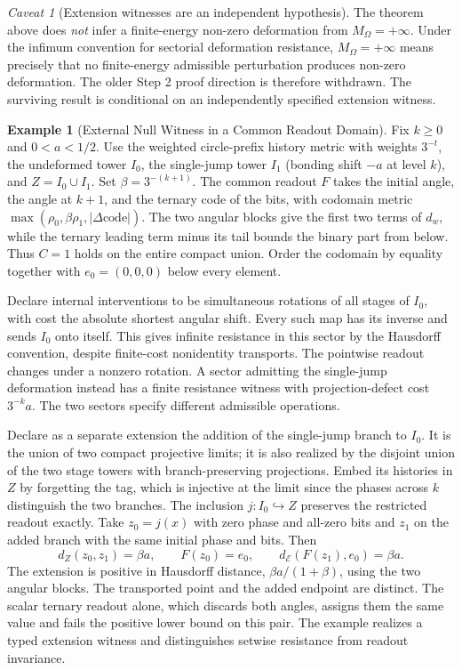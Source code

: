 \documentclass[11pt,a4paper]{article}
\theoremstyle{plain}
\theoremstyle{definition}
\newtheorem{example}[theorem]{Example}
\theoremstyle{remark}
\newtheorem{caveat}[theorem]{Caveat}
\newcommand{\MO}{M_\Omega}
\begin{document}
\begin{caveat}[Extension witnesses are an independent hypothesis]
The theorem above does \emph{not} infer a finite-energy non-zero deformation from $\MO=+\infty$. Under the infimum convention for sectorial deformation resistance, $\MO=+\infty$ means precisely that no finite-energy admissible perturbation produces non-zero deformation. The older Step 2 proof direction is therefore withdrawn. The surviving result is conditional on an independently specified extension witness.
\end{caveat}

\begin{example}[External Null Witness in a Common Readout Domain]\label{ex:joint-external-null-witness}
Fix $k\geq0$ and $0<a<1/2$. Use the weighted circle-prefix history metric with weights $3^{-t}$, the undeformed tower $I_0$, the single-jump tower $I_1$ (bonding shift $-a$ at level $k$), and $Z=I_0\cup I_1$. Set $\beta=3^{-(k+1)}$. The common readout $F$ takes the initial angle, the angle at $k+1$, and the ternary code of the bits, with codomain metric $\max(\rho_0,\beta\rho_1,|\Delta\text{code}|)$. The two angular blocks give the first two terms of $d_w$, while the ternary leading term minus its tail bounds the binary part from below. Thus $C=1$ holds on the entire compact union. Order the codomain by equality together with $e_0=(0,0,0)$ below every element.

Declare internal interventions to be simultaneous rotations of all stages of $I_0$, with cost the absolute shortest angular shift. Every such map has its inverse and sends $I_0$ onto itself. This gives infinite resistance in this sector by the Hausdorff convention, despite finite-cost nonidentity transports. The pointwise readout changes under a nonzero rotation. A sector admitting the single-jump deformation instead has a finite resistance witness with projection-defect cost $3^{-k}a$. The two sectors specify different admissible operations.

Declare as a separate extension the addition of the single-jump branch to $I_0$. It is the union of two compact projective limits; it is also realized by the disjoint union of the two stage towers with branch-preserving projections. Embed its histories in $Z$ by forgetting the tag, which is injective at the limit since the phases across $k$ distinguish the two branches. The inclusion $j:I_0\hookrightarrow Z$ preserves the restricted readout exactly. Take $z_0=j(x)$ with zero phase and all-zero bits and $z_1$ on the added branch with the same initial phase and bits. Then
\[
 d_Z(z_0,z_1)=\beta a,\qquad F(z_0)=e_0,\qquad
 d_{\mathcal E}(F(z_1),e_0)=\beta a.
\]
The extension is positive in Hausdorff distance, $\beta a/(1+\beta)$, using the two angular blocks. The transported point and the added endpoint are distinct. The scalar ternary readout alone, which discards both angles, assigns them the same value and fails the positive lower bound on this pair. The example realizes a typed extension witness and distinguishes setwise resistance from readout invariance.
\end{example}
\end{document}
